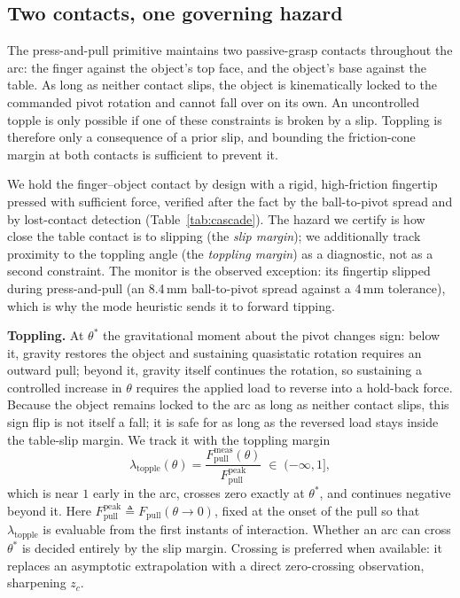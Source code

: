 \documentclass[10pt, conference]{IEEEtran}
\begin{document}
\subsection{Two contacts, one governing hazard}
The press-and-pull primitive maintains two passive-grasp contacts throughout the arc: the finger against the object's top face, and the object's base against the table. As long as neither contact slips, the object is kinematically locked to the commanded pivot rotation and cannot fall over on its own. An uncontrolled topple is only possible if one of these constraints is broken by a slip. Toppling is therefore only a consequence of a prior slip, and bounding the friction-cone margin at both contacts is sufficient to prevent it.

We hold the finger--object contact by design with a rigid, high-friction fingertip pressed with sufficient force, verified after the fact by the ball-to-pivot spread and by lost-contact detection (Table~\ref{tab:cascade}). The hazard we certify is how close the table contact is to slipping (the \emph{slip margin}); we additionally track proximity to the toppling angle (the \emph{toppling margin}) as a diagnostic, not as a second constraint. The monitor is the observed exception: its fingertip slipped during press-and-pull (an 8.4\,mm ball-to-pivot spread against a 4\,mm tolerance), which is why the mode heuristic sends it to forward tipping.

\noindent \textbf{Toppling.} At $\theta^{*}$ the gravitational moment about the pivot changes sign: below it, gravity restores the object and sustaining quasistatic rotation requires an outward pull; beyond it, gravity itself continues the rotation, so sustaining a controlled increase in $\theta$ requires the applied load to reverse into a hold-back force. Because the object remains locked to the arc as long as neither contact slips, this sign flip is not itself a fall; it is safe for as long as the reversed load stays inside the table-slip margin. We track it with the toppling margin
\begin{equation}
    \lambda_{\mathrm{topple}}(\theta) = \frac{F_{\mathrm{pull}}^{\mathrm{meas}}(\theta)}{F_{\mathrm{pull}}^{\mathrm{peak}}}
    \;\in\;(-\infty,1],
    \label{eq:m_topple}
\end{equation}
which is near $1$ early in the arc, crosses zero exactly at $\theta^{*}$, and continues negative beyond it. Here $F_{\mathrm{pull}}^{\mathrm{peak}} \triangleq F_{\mathrm{pull}}(\theta \to 0)$, fixed at the onset of the pull so that $\lambda_{\mathrm{topple}}$ is evaluable from the first instants of interaction. Whether an arc can cross $\theta^{*}$ is decided entirely by the slip margin. Crossing is preferred when available: it replaces an asymptotic extrapolation with a direct zero-crossing observation, sharpening $z_c$.
\end{document}
